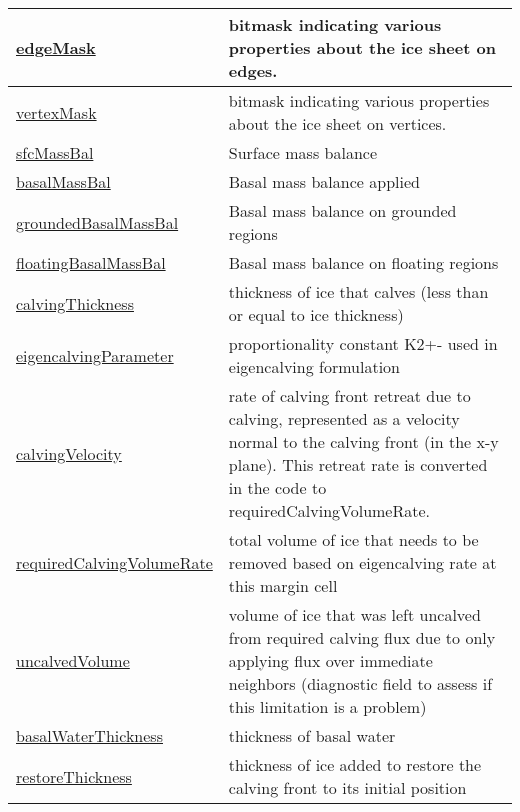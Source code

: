 {\begin{center}
\begin{longtable}{| p{2.0in} | p{4.0in} |}
    \hline
    \hyperref[subsec:var_sec_geometry_edgeMask]{edgeMask} & bitmask indicating various properties about the ice sheet on edges. \\
    \hline
    \hyperref[subsec:var_sec_geometry_vertexMask]{vertexMask} & bitmask indicating various properties about the ice sheet on vertices. \\
    \hline
    \hyperref[subsec:var_sec_geometry_sfcMassBal]{sfcMassBal} & Surface mass balance \\
    \hline
    \hyperref[subsec:var_sec_geometry_basalMassBal]{basalMassBal} & Basal mass balance applied \\
    \hline
    \hyperref[subsec:var_sec_geometry_groundedBasalMassBal]{groundedBasalMassBal} & Basal mass balance on grounded regions \\
    \hline
    \hyperref[subsec:var_sec_geometry_floatingBasalMassBal]{floatingBasalMassBal} & Basal mass balance on floating regions \\
    \hline
    \hyperref[subsec:var_sec_geometry_calvingThickness]{calvingThickness} & thickness of ice that calves (less than or equal to ice thickness) \\
    \hline
    \hyperref[subsec:var_sec_geometry_eigencalvingParameter]{eigencalvingParameter} & proportionality constant K2+- used in eigencalving formulation \\
    \hline
    \hyperref[subsec:var_sec_geometry_calvingVelocity]{calvingVelocity} & rate of calving front retreat due to calving, represented as a velocity normal to the calving front (in the x-y plane).  This retreat rate is converted in the code to requiredCalvingVolumeRate. \\
    \hline
    \hyperref[subsec:var_sec_geometry_requiredCalvingVolumeRate]{requiredCalvingVolumeRate} & total volume of ice that needs to be removed based on eigencalving rate at this margin cell \\
    \hline
    \hyperref[subsec:var_sec_geometry_uncalvedVolume]{uncalvedVolume} & volume of ice that was left uncalved from required calving flux due to only applying flux over immediate neighbors (diagnostic field to assess if this limitation is a problem) \\
    \hline
    \hyperref[subsec:var_sec_geometry_basalWaterThickness]{basalWaterThickness} & thickness of basal water \\
    \hline
    \hyperref[subsec:var_sec_geometry_restoreThickness]{restoreThickness} & thickness of ice added to restore the calving front to its initial position \\

\end{longtable}
\end{center}}

